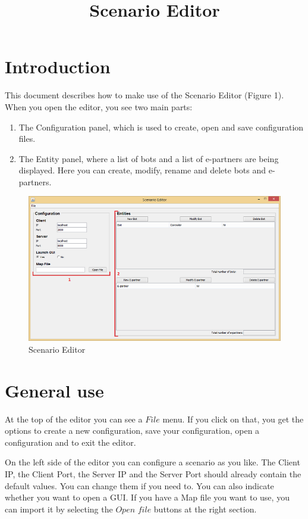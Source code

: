 \documentclass[a4paper]{article}
\title{Scenario Editor}
\date{}
\begin{document}
\maketitle
\newpage

\tableofcontents
\newpage

\section{Introduction}
This document describes how to make use of the Scenario Editor (Figure 1). When you open the editor, you see two main parts:
\begin{enumerate}
\item The Configuration panel, which is used to create, open and save configuration files.
\item The Entity panel, where a list of bots and a list of e-partners are being displayed. Here you can create, modify, rename and delete bots and e-partners.
\end{enumerate}

\begin{figure}[h]
\includegraphics{editor.png}
\caption{Scenario Editor}
\end{figure}

\section{General use}
At the top of the editor you can see a $File$ menu. If you click on that, you get the options to create a new configuration, save your configuration, open a configuration and to exit the editor.

On the left side of the editor you can configure a scenario as you like. The Client IP, the Client Port, the Server IP and the Server Port should already contain the default values. You can change them if you need to. You can also indicate whether you want to open a GUI. If you have a Map file you want to use, you can import it by selecting the $Open$ $file$ buttons at the right section.
\end{document}
